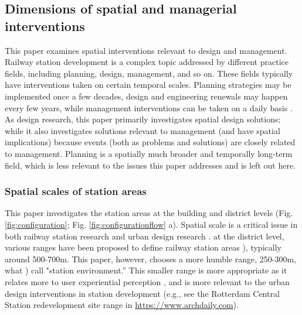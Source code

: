 \documentclass[]{article}
\begin{document}
\subsection{Dimensions of spatial and managerial interventions}
\label{Dimensions of spatial and managerial interventions}
This paper examines spatial interventions relevant to design and management. Railway station development is a complex topic addressed by different practice fields, including planning, design, management, and so on. These fields typically have interventions taken on certain temporal scales. Planning strategies may be implemented once a few decades, design and engineering renewals may happen every few years, while management interventions can be taken on a daily basis \citep{carmonaPublicPlacesUrban2010}. As design research, this paper primarily investigates spatial design solutions; while it also investigates solutions relevant to management (and have spatial implications) because events (both as problems and solutions) are closely related to management. Planning is a spatially much broader and temporally long-term field, which is less relevant to the issues this paper addresses and is left out here.

\subsubsection{Spatial scales of station areas}
\label{Spatial scales of station areas}
This paper investigates the station areas at the building and district levels (Fig. \ref{fig:configuration}; Fig. \ref{fig:configurationflow} a). Spatial scale is a critical issue in both railway station research and urban design research \citep{duPlaceQualityHighspeed2021, lloyd-jonesDesignProblems2001}. at the district level, various ranges have been proposed to define railway station areas \citep{calthorpeNextAmericanMetropolis1993, bertoliniStationAreasNodes2008}), typically around 500-700m. This paper, however, chooses a more humble range, 250-300m, what \citet{peekCreatingSynergyStations2002}) call "station environment.” This smaller range is more appropriate as it relates more to user experiential perception \citep{chenEvaluateUserSatisfaction2024}, and is more relevant to the urban design interventions in station development (e.g., see the Rotterdam Central Station redevelopment site range in \href{https://www.archdaily.com/447649/rotterdam-centraal-team-cs}{https://www.archdaily.com}).
\end{document}
